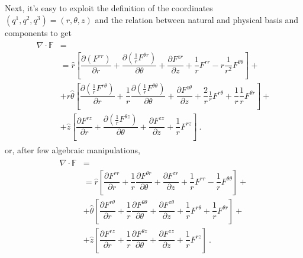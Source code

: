 \documentclass[letterpaper,10pt,english]{jupyterBook}
\begin{document}
\sphinxAtStartPar
Next, it’s easy to exploit the definition of the coordinates \(\left( q^1, q^2, q^3 \right) = \left( r, \theta, z  \right)\) and the relation between natural and physical basis and components to get
\begin{equation*}
\begin{split}\begin{aligned}
  \nabla \cdot \mathbb{F} & = \\
  & = \hat{r} \left[ \dfrac{\partial \left( F^{rr} \right)}{\partial r} + \dfrac{\partial \left( \frac{1}{r} F^{\theta r} \right)}{\partial \theta} + \dfrac{\partial F^{z r}}{\partial z} + \dfrac{1}{r} F^{rr} - r \dfrac{1}{r^2} F^{\theta \theta}  \right] + \\
  & + r \hat{\theta} \left[ \dfrac{\partial \left( \frac{1}{r} F^{r \theta} \right)}{\partial r} + \dfrac{1}{r} \dfrac{\partial \left(\frac{1}{r} F^{\theta \theta} \right)}{\partial \theta} + \dfrac{\partial F^{z \theta}}{\partial z} + \dfrac{2}{r} \frac{1}{r} F^{r \theta} + \dfrac{1}{r} \dfrac{1}{r} F^{\theta r} \right] + \\
  & + \hat{z} \left[ \dfrac{\partial F^{r z}}{\partial r} + \dfrac{\partial \left( \frac{1}{r} F^{\theta z} \right)}{\partial \theta} + \dfrac{\partial F^{zz}}{\partial z} + \dfrac{1}{r} F^{rz} \right] \ .
\end{aligned}\end{split}
\end{equation*}
\sphinxAtStartPar
or, after few algebraic manipulations,
\begin{equation*}
\begin{split}\begin{aligned}
  \nabla \cdot \mathbb{F} & = \\
  & = \hat{r} \left[ \dfrac{\partial  F^{rr} }{\partial r} +  \dfrac{1}{r} \dfrac{\partial F^{\theta r} }{\partial \theta} + \dfrac{\partial F^{z r}}{\partial z} + \dfrac{1}{r} F^{rr} - \dfrac{1}{r} F^{\theta \theta}  \right] + \\
  & + \hat{\theta} \left[ \dfrac{\partial F^{r \theta} }{\partial r} + \dfrac{1}{r} \dfrac{\partial F^{\theta \theta} }{\partial \theta} + \dfrac{\partial F^{z \theta}}{\partial z} + \dfrac{1}{r} F^{r \theta} + \dfrac{1}{r} F^{\theta r} \right] + \\
  & + \hat{z} \left[ \dfrac{\partial F^{r z}}{\partial r} + \dfrac{1}{r} \dfrac{\partial F^{\theta z} }{\partial \theta} + \dfrac{\partial F^{zz}}{\partial z} + \dfrac{1}{r} F^{rz} \right] \ .
\end{aligned}\end{split}
\end{equation*}
\end{document}
